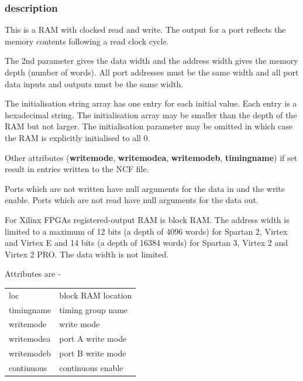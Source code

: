 \documentclass[10pt,a4paper,twoside,fleqn]{book}
\begin{document}
                \subsubsection{description}

                    This is a RAM with clocked read and write. The output for a
                    port reflects the memory contents following a read clock
                    cycle.

                    The 2nd parameter gives the data width and the address width
                    gives the memory depth (number of words). All port addresses
                    must be the same width and all port data inputs and outputs
                    must be the same width.

                    The initialisation string array has one entry for each
                    initial value. Each entry is a hexadecimal string. The
                    initialisation array may be smaller than the depth of the
                    RAM but not larger. The initialisation parameter may be
                    omitted in which case the RAM is explicitly initialised to
                    all 0.

                    Other attributes ({\bf writemode}, {\bf writemodea}, {\bf
                    writemodeb}, {\bf timingname}) if set result in entries
                    written to the NCF file.

                    Ports which are not written have null arguments for the data
                    in and the write enable. Ports which are not read have null
                    arguments for the data out.

                    For Xilinx FPGAs registered-output RAM is block RAM. The
                    address width is limited to a maximum of 12 bits (a depth of
                    4096 words) for Spartan 2, Virtex and  Virtex E and 14 bits
                    (a depth of 16384 words) for Spartan 3, Virtex 2 and Virtex
                    2 PRO. The data width is not limited.
                
                    Attributes are -
                    
                    \begin{tabular}{| l | l |}
                    \hline
                    loc             & block RAM location \\
                    timingname      & timing group name \\
                    writemode       & write mode \\
                    writemodea      & port A write mode \\
                    writemodeb      & port B write mode \\
                    continuous      & continuous enable \\           
                    \hline
                    \end{tabular}
                    
\end{document}
